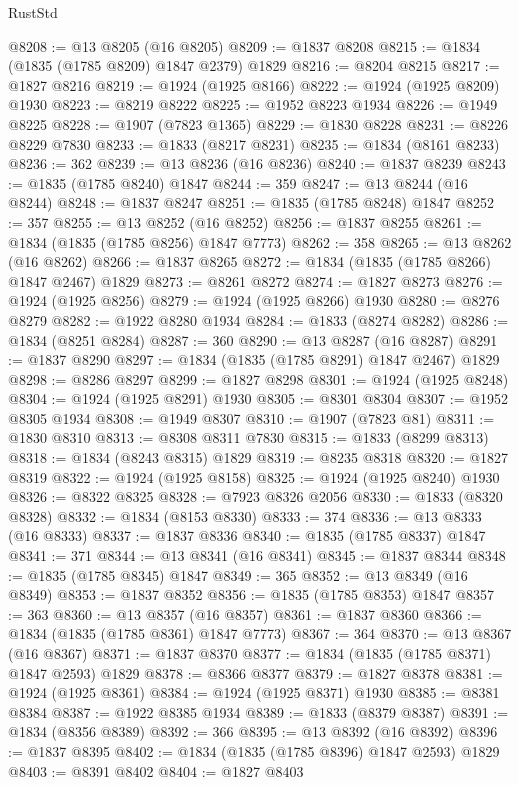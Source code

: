 \begin{lexlean}{RustStd}
\begin{coremodule}
@8208 := @13 @8205 (@16 @8205)
@8209 := @1837 @8208
@8215 := @1834 (@1835 (@1785 @8209) @1847 @2379) @1829
@8216 := @8204 @8215
@8217 := @1827 @8216
@8219 := @1924 (@1925 @8166)
@8222 := @1924 (@1925 @8209) @1930
@8223 := @8219 @8222
@8225 := @1952 @8223 @1934
@8226 := @1949 @8225
@8228 := @1907 (@7823 @1365)
@8229 := @1830 @8228
@8231 := @8226 @8229 @7830
@8233 := @1833 (@8217 @8231)
@8235 := @1834 (@8161 @8233)
@8236 := 362
@8239 := @13 @8236 (@16 @8236)
@8240 := @1837 @8239
@8243 := @1835 (@1785 @8240) @1847
@8244 := 359
@8247 := @13 @8244 (@16 @8244)
@8248 := @1837 @8247
@8251 := @1835 (@1785 @8248) @1847
@8252 := 357
@8255 := @13 @8252 (@16 @8252)
@8256 := @1837 @8255
@8261 := @1834 (@1835 (@1785 @8256) @1847 @7773)
@8262 := 358
@8265 := @13 @8262 (@16 @8262)
@8266 := @1837 @8265
@8272 := @1834 (@1835 (@1785 @8266) @1847 @2467) @1829
@8273 := @8261 @8272
@8274 := @1827 @8273
@8276 := @1924 (@1925 @8256)
@8279 := @1924 (@1925 @8266) @1930
@8280 := @8276 @8279
@8282 := @1922 @8280 @1934
@8284 := @1833 (@8274 @8282)
@8286 := @1834 (@8251 @8284)
@8287 := 360
@8290 := @13 @8287 (@16 @8287)
@8291 := @1837 @8290
@8297 := @1834 (@1835 (@1785 @8291) @1847 @2467) @1829
@8298 := @8286 @8297
@8299 := @1827 @8298
@8301 := @1924 (@1925 @8248)
@8304 := @1924 (@1925 @8291) @1930
@8305 := @8301 @8304
@8307 := @1952 @8305 @1934
@8308 := @1949 @8307
@8310 := @1907 (@7823 @81)
@8311 := @1830 @8310
@8313 := @8308 @8311 @7830
@8315 := @1833 (@8299 @8313)
@8318 := @1834 (@8243 @8315) @1829
@8319 := @8235 @8318
@8320 := @1827 @8319
@8322 := @1924 (@1925 @8158)
@8325 := @1924 (@1925 @8240) @1930
@8326 := @8322 @8325
@8328 := @7923 @8326 @2056
@8330 := @1833 (@8320 @8328)
@8332 := @1834 (@8153 @8330)
@8333 := 374
@8336 := @13 @8333 (@16 @8333)
@8337 := @1837 @8336
@8340 := @1835 (@1785 @8337) @1847
@8341 := 371
@8344 := @13 @8341 (@16 @8341)
@8345 := @1837 @8344
@8348 := @1835 (@1785 @8345) @1847
@8349 := 365
@8352 := @13 @8349 (@16 @8349)
@8353 := @1837 @8352
@8356 := @1835 (@1785 @8353) @1847
@8357 := 363
@8360 := @13 @8357 (@16 @8357)
@8361 := @1837 @8360
@8366 := @1834 (@1835 (@1785 @8361) @1847 @7773)
@8367 := 364
@8370 := @13 @8367 (@16 @8367)
@8371 := @1837 @8370
@8377 := @1834 (@1835 (@1785 @8371) @1847 @2593) @1829
@8378 := @8366 @8377
@8379 := @1827 @8378
@8381 := @1924 (@1925 @8361)
@8384 := @1924 (@1925 @8371) @1930
@8385 := @8381 @8384
@8387 := @1922 @8385 @1934
@8389 := @1833 (@8379 @8387)
@8391 := @1834 (@8356 @8389)
@8392 := 366
@8395 := @13 @8392 (@16 @8392)
@8396 := @1837 @8395
@8402 := @1834 (@1835 (@1785 @8396) @1847 @2593) @1829
@8403 := @8391 @8402
@8404 := @1827 @8403

\end{coremodule}
\end{lexlean}
